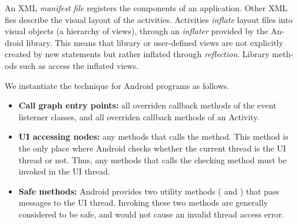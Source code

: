 An XML \textit{manifest file} registers the components of an application. Other XML
fies describe the visual layout of the activities. Activities \textit{inflate}
layout files into
visual objects (a hierarchy of views), through an \textit{inflater} provided by the An-
droid library. This means that library or user-defined views are not explicitly
created by new statements but rather inflated through \textit{reflection}. Library meth-
ods such as  access the inflated views.

We instantiate the technique for Android programs as follows.

\begin{itemize}

\item \textbf{Call graph entry points: } all overriden callback methods of the event
listerner classes, and all overriden callback methods of an Activity. 

\item \textbf{UI accessing nodes: } any methods that calls the 
method. This method is the only place where Android checks
whether the current thread is the UI thread or not. Thus, any
methods that calls the checking method must be invoked in the UI thread.

\item \textbf{Safe methods: } Android provides two utility methods (
and ) that pass messages to the UI thread.
 Invoking these two methods are generally considered to be safe, and would not
cause an invalid thread access error.

\end{itemize}
